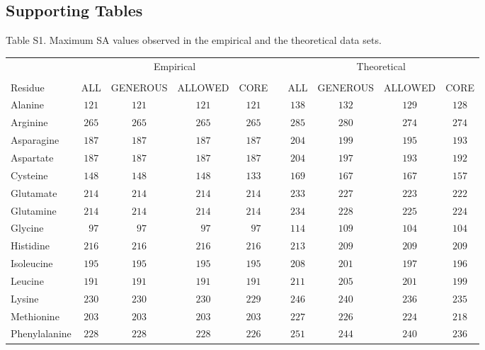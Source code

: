 \documentclass[12pt]{article}
\begin{document}
\newpage
\subsection*{Supporting Tables}



\noindent Table S1. Maximum SA values observed in the empirical and the theoretical data sets.

\begin{center}
\scriptsize
\begin{tabular}{lccccccccc}
 & \multicolumn{4}{c}{Empirical} &&\multicolumn{4}{c}{Theoretical}\\\cline{2-5}\cline{7-10}\\[-1.6ex]
Residue          & ALL & GENEROUS & ALLOWED & CORE & & ALL & GENEROUS & ALLOWED & CORE\\
\hline Alanine   & $121$ & $121$ & $121$ & $121$ & & $138$ & $132$ & $129$ & $128$\\
Arginine         & $265$ & $265$ & $265$ & $265$ & & $285$ & $280$ & $274$ & $274$\\
Asparagine       & $187$ & $187$ & $187$ & $187$ & & $204$ & $199$ & $195$ & $193$\\
Aspartate        & $187$ & $187$ & $187$ & $187$ & & $204$ & $197$ & $193$ & $192$\\
Cysteine         & $148$ & $148$ & $148$ & $133$ & & $169$ & $167$ & $167$ & $157$\\
Glutamate        & $214$ & $214$ & $214$ & $214$ & & $233$ & $227$ & $223$ & $222$\\
Glutamine        & $214$ & $214$ & $214$ & $214$ & & $234$ & $228$ & $225$ & $224$\\
Glycine          & $\phantom{0}97$ & $\phantom{0}97$ & $\phantom{0}97$ & $\phantom{0}97$ & & $114$ & $109$ & $104$ & $104$\\
Histidine        & $216$ & $216$ & $216$ & $216$ & & $213$ & $209$ & $209$ & $209$\\
Isoleucine       & $195$ & $195$ & $195$ & $195$ & & $208$ & $201$ & $197$ & $196$\\
Leucine          & $191$ & $191$ & $191$ & $191$ & & $211$ & $205$ & $201$ & $199$\\
Lysine           & $230$ & $230$ & $230$ & $229$ & & $246$ & $240$ & $236$ & $235$\\
Methionine       & $203$ & $203$ & $203$ & $203$ & & $227$ & $226$ & $224$ & $218$\\
Phenylalanine    & $228$ & $228$ & $228$ & $226$ & & $251$ & $244$ & $240$ & $236$\\

\end{tabular}
\end{center}
\end{document}

